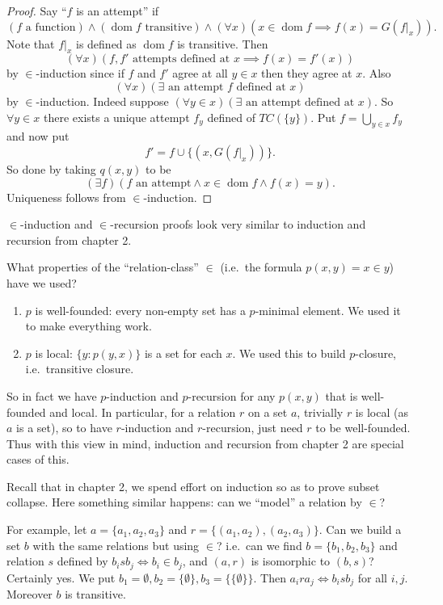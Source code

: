 \documentclass[a4paper]{article}
\DeclareMathOperator{\dom}{dom}%
\begin{document}
\begin{proof}
  Say ``\(f\) is an attempt'' if
  \[
    (f \text{ a function}) \land (\dom f \text{ transitive}) \land (\forall x) (x \in \dom f \implies f(x) = G(f|_x)).
  \]
  Note that \(f|_x\) is defined as \(\dom f\) is transitive. Then
  \[
    (\forall x) (f, f' \text{ attempts defined at } x \implies f(x) = f'(x))
  \]
  by \(\in\)-induction since if \(f\) and \(f'\) agree at all \(y \in x\) then they agree at \(x\). Also
  \[
    (\forall x) (\exists \text{ an attempt \(f\) defined at } x)
  \]
  by \(\in\)-induction. Indeed suppose \((\forall y \in x) (\exists \text{ an attempt defined at } x)\). So \(\forall y \in x\) there exists a unique attempt \(f_y\) defined of \(TC(\{y\})\). Put \(f = \bigcup_{y \in x} f_y\) and now put
  \[
    f' = f \cup \{(x, G(f|_x))\}.
  \]
  So done by taking \(q(x, y)\) to be
  \[
    (\exists f) (f \text{ an attempt} \land x \in \dom f \land f(x) = y).
  \]
  Uniqueness follows from \(\in\)-induction.
\end{proof}

\begin{note}
  \(\in\)-induction and \(\in\)-recursion proofs look very similar to induction and recursion from chapter 2.
\end{note}

What properties of the ``relation-class'' \(\in\) (i.e.\ the formula \(p(x, y) = x \in y\)) have we used?

\begin{enumerate}
\item \(p\) is well-founded: every non-empty set has a \(p\)-minimal element. We used it to make everything work.
\item \(p\) is local: \(\{y: p(y, x)\}\) is a set for each \(x\). We used this to build \(p\)-closure, i.e.\ transitive closure.
\end{enumerate}

So in fact we have \(p\)-induction and \(p\)-recursion for any \(p(x, y)\) that is well-founded and local. In particular, for a relation \(r\) on a set \(a\), trivially \(r\) is local (as \(a\) is a set), so to have \(r\)-induction and \(r\)-recursion, just need \(r\) to be well-founded. Thus with this view in mind, induction and recursion from chapter 2 are special cases of this.

Recall that in chapter 2, we spend effort on induction so as to prove subset collapse. Here something similar happens: can we ``model'' a relation by \(\in\)?

For example, let \(a = \{a_1, a_2, a_3\}\) and \(r = \{(a_1, a_2), (a_2, a_3)\}\). Can we build a set \(b\) with the same relations but using \(\in\)? i.e.\ can we find \(b = \{b_1, b_2, b_3\}\) and relation \(s\) defined by \(b_i s b_j \iff b_i \in b_j\), and \((a, r)\) is isomorphic to \((b, s)\)? Certainly yes. We put \(b_1 = \emptyset, b_2 = \{\emptyset\}, b_3 = \{\{\emptyset\}\}\). Then \(a_i r a_j \iff b_i s b_j\) for all \(i, j\). Moreover \(b\) is transitive.
\end{document}
